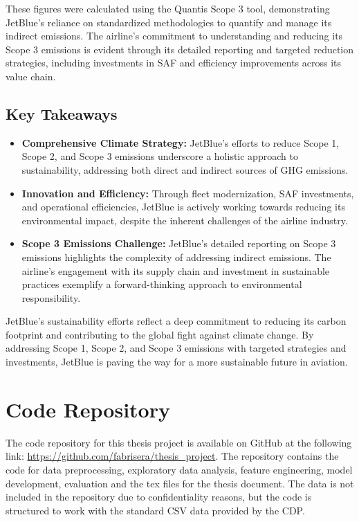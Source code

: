 \noindent These figures were calculated using the Quantis Scope 3 tool, demonstrating JetBlue's reliance on standardized methodologies to quantify and manage its indirect emissions. The airline's commitment to understanding and reducing its Scope 3 emissions is evident through its detailed reporting and targeted reduction strategies, including investments in SAF and efficiency improvements across its value chain.

\subsection*{Key Takeaways}
\begin{itemize}
    \item \textbf{Comprehensive Climate Strategy:} JetBlue's efforts to reduce Scope 1, Scope 2, and Scope 3 emissions underscore a holistic approach to sustainability, addressing both direct and indirect sources of GHG emissions.
    \item \textbf{Innovation and Efficiency:} Through fleet modernization, SAF investments, and operational efficiencies, JetBlue is actively working towards reducing its environmental impact, despite the inherent challenges of the airline industry.
    \item \textbf{Scope 3 Emissions Challenge:} JetBlue's detailed reporting on Scope 3 emissions highlights the complexity of addressing indirect emissions. The airline's engagement with its supply chain and investment in sustainable practices exemplify a forward-thinking approach to environmental responsibility.
\end{itemize}

\noindent JetBlue's sustainability efforts reflect a deep commitment to reducing its carbon footprint and contributing to the global fight against climate change. By addressing Scope 1, Scope 2, and Scope 3 emissions with targeted strategies and investments, JetBlue is paving the way for a more sustainable future in aviation.


\section{Code Repository}
\label{sec:code-repo}

The code repository for this thesis project is available on GitHub at the following link: \url{https://github.com/fabrisera/thesis_project}. The repository contains the code for data preprocessing, exploratory data analysis, feature engineering, model development, evaluation and the tex files for the thesis document. The data is not included in the repository due to confidentiality reasons, but the code is structured to work with the standard CSV data provided by the CDP. 